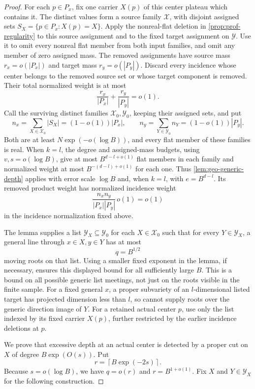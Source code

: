 \begin{proof}
For each $p\in P_x$, fix one carrier $X(p)$ of this center plateau which contains it. The distinct values form a source family $\mathcal{X}$, with disjoint assigned sets $S_X=\{p\in P_x:X(p)=X\}$. Apply the nonreal-flat deletion in \cref{prop:prof-regularity} to this source assignment and to the fixed target assignment on $\mathcal{Y}$. Use it to omit every nonreal flat member from both input families, and omit any member of zero assigned mass. The removed assignments have source mass $r_x=o(|P_x|)$ and target mass $r_y=o(|P_y|)$. Discard every incidence whose center belongs to the removed source set or whose target component is removed. Their total normalized weight is at most
\[
 \frac{r_x}{|P_x|}+\frac{r_y}{|P_y|}=o(1).
\]
Call the surviving distinct families $\mathcal{X}_0,\mathcal{Y}_0$, keeping their assigned sets, and put
\[
 n_x=\sum_{X\in\mathcal{X}_0}|S_X|=(1-o(1))|P_x|,
 \qquad
 n_y=\sum_{Y\in\mathcal{Y}_0}n_Y=(1-o(1))|P_y|.
\]
Both are at least $N\exp(-o(\log B))$, and every flat member of these families is real. When $k=l$, the degree and assigned-mass budgets, using $v,s=o(\log B)$, give at most $B^{d-l+o(1)}$ flat members in each family and normalized weight at most $B^{-(d-l)+o(1)}$ for each one. Thus \cref{lem:geo-generic-depth} applies with error scale $\log B$ and, when $k=l$, with $e=B^{d-l}$. Its removed product weight has normalized incidence weight
\[
 \frac{n_xn_y}{|P_x||P_y|}\,o(1)=o(1)
\]
in the incidence normalization fixed above.

The lemma supplies a list $\mathcal{Y}_X\subseteq\mathcal{Y}_0$ for each $X\in\mathcal{X}_0$ such that for every $Y\in\mathcal{Y}_X$, a general line through $x\in X,y\in Y$ has at most
\[
 q=B^{1/2}
\]
moving roots on that list. Using a smaller fixed exponent in the lemma, if necessary, ensures this displayed bound for all sufficiently large $B$. This is a bound on all possible generic list meetings, not just on the roots visible in the finite sample. For a fixed general $x$, a proper subvariety of an $l$-dimensional listed target has projected dimension less than $l$, so cannot supply roots over the generic direction image of $Y$. For a retained actual center $p$, use only the list indexed by its fixed carrier $X(p)$, further restricted by the earlier incidence deletions at $p$.

We prove that excessive depth at an actual center is detected by a proper cut on $X$ of degree $B\exp(O(s))$. Put
\[
 r=\left\lceil B\exp(-2s)\right\rceil.
\]
Because $s=o(\log B)$, we have $q=o(r)$ and $r=B^{1+o(1)}$. Fix $X$ and $Y\in\mathcal{Y}_X$ for the following construction.


\end{proof}
